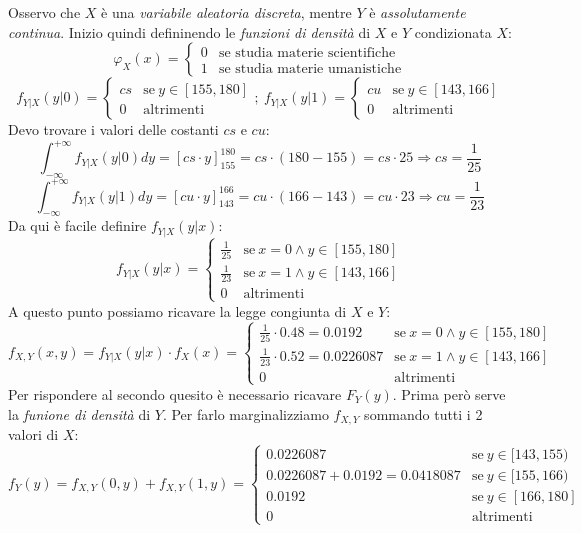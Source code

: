 \documentclass[12pt, a4paper]{report}
\theoremstyle{definition}
\begin{document}
Osservo che $X$ è una \emph{variabile aleatoria discreta}, mentre $Y$ è \emph{
assolutamente continua}. Inizio quindi defininendo le \emph{funzioni di densità}
di $X$ e $Y$ condizionata $X$:
\[\varphi_X(x)=\begin{cases}
	{0} & \text{se studia materie scientifiche}\\
	{1} & \text{se studia materie umanistiche}
\end{cases}\]
\[f_{Y|X}(y|0)=\begin{cases}
	{cs} & \text{se}\ {y\in[155,180]}\\
	{0} & \text{altrimenti}
\end{cases};\ f_{Y|X}(y|1)=\begin{cases}
	{cu} & \text{se}\ {y\in[143,166]}\\
	{0} & \text{altrimenti}
\end{cases}\]
Devo trovare i valori delle costanti $cs$ e $cu$:
\[\int_{-\infty}^{+\infty}f_{Y|X}(y|0)dy=[cs\cdot y]_{155}^{180}=cs\cdot (180-155)=cs\cdot 25
\Rightarrow cs=\frac{1}{25}\]
\[\int_{-\infty}^{+\infty}f_{Y|X}(y|1)dy=[cu\cdot y]_{143}^{166}=cu\cdot (166-143)=cu\cdot 23
\Rightarrow cu=\frac{1}{23}\]
Da qui è facile definire $f_{Y|X}(y|x)$:
\[f_{Y|X}(y|x)=\begin{cases}
	{\frac{1}{25}} & \text{se}\ {x=0\wedge y\in[155,180]}\\
	{\frac{1}{23}} & \text{se}\ {x=1\wedge y\in[143,166]}\\
	{0} & \text{altrimenti}
\end{cases}\]
A questo punto possiamo ricavare la legge congiunta di $X$ e $Y$:
\[f_{X,Y}(x,y)=f_{Y|X}(y|x)\cdot f_{X}(x)=\begin{cases}
	{\frac{1}{25}\cdot 0.48=0.0192} & \text{se}\ {x=0\wedge y\in[155,180]}\\
	{\frac{1}{23}\cdot 0.52=0.0226087} & \text{se}\ {x=1\wedge y\in[143,166]}\\
	{0} & \text{altrimenti}
\end{cases}\]
Per rispondere al secondo quesito è necessario ricavare $F_Y(y)$. Prima però serve
la \emph{funione di densità} di $Y$. Per farlo marginalizziamo $f_{X,Y}$ sommando
tutti i 2 valori di $X$:
\[f_Y(y)=f_{X,Y}(0,y)+f_{X,Y}(1,y)=\begin{cases}
	{0.0226087} & \text{se}\ {y\in[143,155)}\\
	{0.0226087+0.0192=0.0418087} & \text{se}\ {y\in[155,166)}\\
	{0.0192} & \text{se}\ {y\in[166,180]}\\
	{0} & \text{altrimenti}
\end{cases}\]
\end{document}
